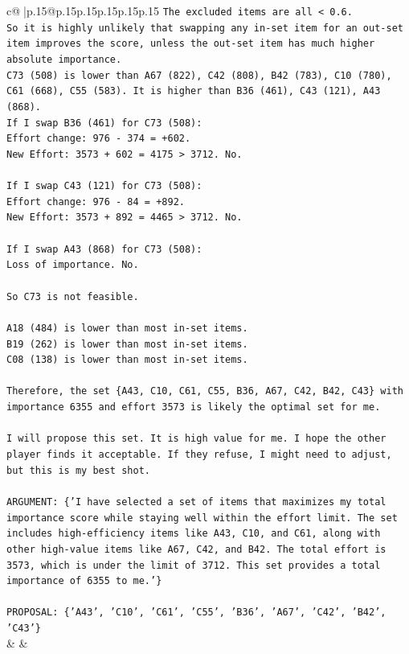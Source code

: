 \documentclass{article}
\begin{document}
{\begin{supertabular}{c@{$\;$}|p{.15\linewidth}@{}p{.15\linewidth}p{.15\linewidth}p{.15\linewidth}p{.15\linewidth}p{.15\linewidth}}
{{{\texttt{The excluded items are all < 0.6.} \\
\texttt{So it is highly unlikely that swapping any in{-}set item for an out{-}set item improves the score, unless the out{-}set item has much higher absolute importance.} \\
\texttt{C73 (508) is lower than A67 (822), C42 (808), B42 (783), C10 (780), C61 (668), C55 (583). It is higher than B36 (461), C43 (121), A43 (868).} \\
\texttt{If I swap B36 (461) for C73 (508):} \\
\texttt{Effort change: 976 {-} 374 = +602.} \\
\texttt{New Effort: 3573 + 602 = 4175 > 3712. No.} \\
\\ 
\texttt{If I swap C43 (121) for C73 (508):} \\
\texttt{Effort change: 976 {-} 84 = +892.} \\
\texttt{New Effort: 3573 + 892 = 4465 > 3712. No.} \\
\\ 
\texttt{If I swap A43 (868) for C73 (508):} \\
\texttt{Loss of importance. No.} \\
\\ 
\texttt{So C73 is not feasible.} \\
\\ 
\texttt{A18 (484) is lower than most in{-}set items.} \\
\texttt{B19 (262) is lower than most in{-}set items.} \\
\texttt{C08 (138) is lower than most in{-}set items.} \\
\\ 
\texttt{Therefore, the set \{A43, C10, C61, C55, B36, A67, C42, B42, C43\} with importance 6355 and effort 3573 is likely the optimal set for me.} \\
\\ 
\texttt{I will propose this set. It is high value for me. I hope the other player finds it acceptable. If they refuse, I might need to adjust, but this is my best shot.} \\
\\ 
\texttt{ARGUMENT: \{'I have selected a set of items that maximizes my total importance score while staying well within the effort limit. The set includes high{-}efficiency items like A43, C10, and C61, along with other high{-}value items like A67, C42, and B42. The total effort is 3573, which is under the limit of 3712. This set provides a total importance of 6355 to me.'\}} \\
\\ 
\texttt{PROPOSAL: \{'A43', 'C10', 'C61', 'C55', 'B36', 'A67', 'C42', 'B42', 'C43'\}} \\
            }
        }
    }
    & & \\ \\


\end{supertabular}}
\end{document}
